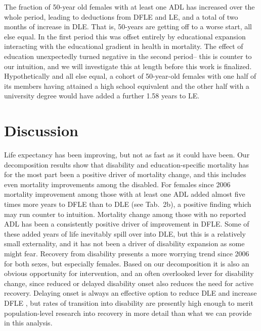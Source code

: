 The fraction of 50-year old females with at least one ADL has increased over the whole period, leading to deductions from DFLE and LE, and a total of two months of increase in DLE. That is, 50-years are getting off to a worse start, all else equal. In the first period this was offset entirely by educational expansion interacting with the educational gradient in health in mortality. The effect of education unexpectedly turned negative in the second period-- this is counter to our intuition, and we will investigate this at length before this work is finalized. Hypothetically and all else equal, a cohort of 50-year-old females with one half of its members having attained a high school equivalent and the other half with a university degree would have added a further 1.58 years to LE.

\section{Discussion}
\label{sec:discussion}
Life expectancy has been improving, but not as fast as it could have been. Our decomposition results show that disability and education-specific mortality has for the most part been a positive driver of mortality change, and this includes even mortality improvements among the disabled. For females since 2006 mortality improvement among those with at least one ADL added almost five times more years to DFLE than to DLE (see Tab.~2b), a positive finding which may run counter to intuition. Mortality change among those with no reported ADL has been a consistently positive driver of improvement in DFLE. Some of these added years of life inevitably spill over into DLE, but this is a relatively small externality, and it has not been a driver of disability expansion as some might fear. Recovery from disability presents a more worrying trend since 2006 for both sexes, but especially females. Based on our decomposition it is also an obvious opportunity for intervention, and an often overlooked lever for disability change, since reduced or delayed disability onset also reduces the need for active recovery. Delaying onset is always an effective option to reduce DLE and increase DFLE \citep[c.f.][]{freedman2016disability}, but rates of transition into disability are presently high enough to merit population-level research into recovery in more detail than what we can provide in this analysis.

